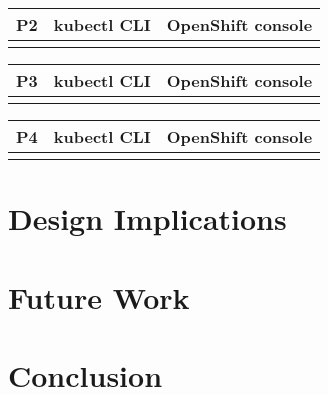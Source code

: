 \documentclass[11pt, oneside]{article}   	%
\begin{document}
\begin{center}
\begin{tabular}{ | c | c | c | } 
  \hline
  P2 & kubectl CLI & OpenShift console \\ 
  \hline
   &  &  \\ 
  \hline
\end{tabular}
\end{center}

\begin{center}
\begin{tabular}{ | c | c | c | } 
  \hline
  P3 & kubectl CLI & OpenShift console \\ 
  \hline
   &  &  \\ 
  \hline
\end{tabular}
\end{center}

\begin{center}
\begin{tabular}{ | c | c | c | } 
  \hline
  P4 & kubectl CLI & OpenShift console \\ 
  \hline
   &  &  \\ 
  \hline
\end{tabular}
\end{center}

\section{Design Implications}

\section{Future Work}

\section{Conclusion}



\end{document}
